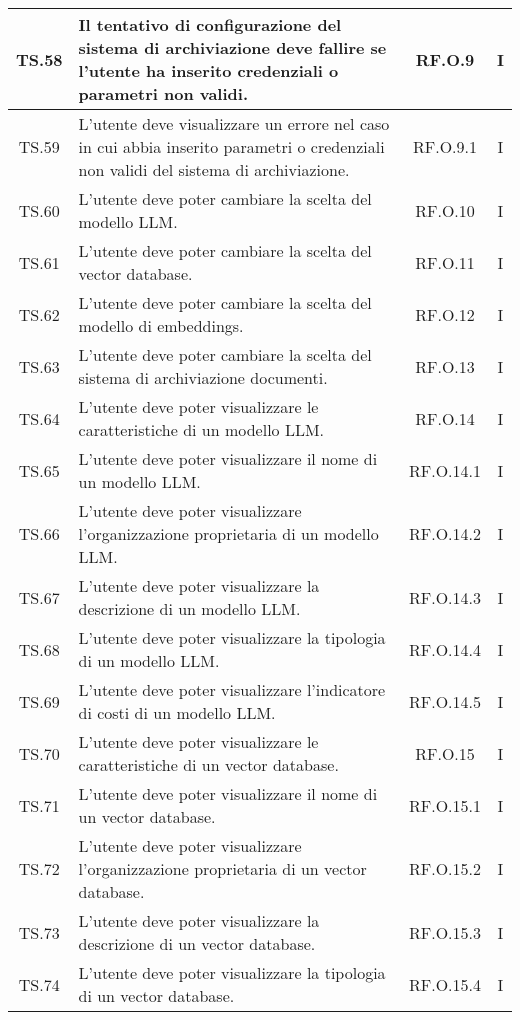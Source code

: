 {{{{{{{{{{\begin{xltabular}{\textwidth}{|c|X|c|c|}
    \hline
    TS.58 & Il tentativo di configurazione del sistema di archiviazione deve fallire se l’utente ha inserito credenziali o parametri non validi. & RF.O.9 & I \\
    \hline
    TS.59 & L’utente deve visualizzare un errore nel caso in cui abbia inserito parametri o credenziali non validi del sistema di archiviazione. & RF.O.9.1 & I \\
    \hline
    TS.60 & L’utente deve poter cambiare la scelta del modello LLM. & RF.O.10 & I \\
    \hline
    TS.61 & L’utente deve poter cambiare la scelta del vector database. & RF.O.11 & I \\
    \hline
    TS.62 & L’utente deve poter cambiare la scelta del modello di embeddings. & RF.O.12 & I \\
    \hline
    TS.63 & L’utente deve poter cambiare la scelta del sistema di archiviazione documenti. & RF.O.13 & I \\
    \hline
    TS.64 & L’utente deve poter visualizzare le caratteristiche di un modello LLM. & RF.O.14 & I \\
    \hline
    TS.65 & L’utente deve poter visualizzare il nome di un modello LLM. & RF.O.14.1 & I \\
    \hline
    TS.66 & L’utente deve poter visualizzare l’organizzazione proprietaria di un modello LLM. & RF.O.14.2 & I \\
    \hline
    TS.67 & L’utente deve poter visualizzare la descrizione di un modello LLM. & RF.O.14.3 & I \\
    \hline
    TS.68 & L’utente deve poter visualizzare la tipologia di un modello LLM. & RF.O.14.4 & I \\
    \hline
    TS.69 & L’utente deve poter visualizzare l’indicatore di costi di un modello LLM. & RF.O.14.5 & I \\
    \hline
    TS.70 & L’utente deve poter visualizzare le caratteristiche di un vector database. & RF.O.15 & I \\
    \hline
    TS.71 & L’utente deve poter visualizzare il nome di un vector database. & RF.O.15.1 & I \\
    \hline
    TS.72 & L’utente deve poter visualizzare l’organizzazione proprietaria di un vector database. & RF.O.15.2 & I \\
    \hline
    TS.73 & L’utente deve poter visualizzare la descrizione di un vector database. & RF.O.15.3 & I \\
    \hline
    TS.74 & L’utente deve poter visualizzare la tipologia di un vector database. & RF.O.15.4 & I \\

\end{xltabular}}}}}}}}}}}

